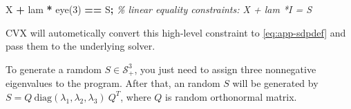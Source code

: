 \documentclass[
]{book}
\newenvironment{Shaded}{\begin{snugshade}}{\end{snugshade}}
\newcommand{\CommentTok}[1]{\textcolor[rgb]{0.56,0.35,0.01}{\textit{#1}}}
\newcommand{\FloatTok}[1]{\textcolor[rgb]{0.00,0.00,0.81}{#1}}
\newcommand{\NormalTok}[1]{#1}
\newcommand{\OperatorTok}[1]{\textcolor[rgb]{0.81,0.36,0.00}{\textbf{#1}}}
\newcommand{\VariableTok}[1]{\textcolor[rgb]{0.00,0.00,0.00}{#1}}
\theoremstyle{definition}
\theoremstyle{definition}
\theoremstyle{definition}
\theoremstyle{definition}
\theoremstyle{remark}
\begin{document}
\begin{Shaded}
\begin{Highlighting}[]
\VariableTok{X} \OperatorTok{+} \VariableTok{lam} \OperatorTok{*} \VariableTok{eye}\NormalTok{(}\FloatTok{3}\NormalTok{) }\OperatorTok{==} \VariableTok{S}\OperatorTok{;} \CommentTok{\% linear equality constraints: X + lam *I = S}
\end{Highlighting}
\end{Shaded}

CVX will autometically convert this high-level constraint to \eqref{eq:app-sdpdef} and pass them to the underlying solver.

To generate a ramdom \(S \in \mathcal{S}_+^3\), you just need to assign three nonnegative eigenvalues to the program. After that, an random \(S\) will be generated by \(S = Q \ \text{diag}(\lambda_1, \lambda_2, \lambda_3) \ Q^T\), where \(Q\) is random orthonormal matrix.
\end{document}

